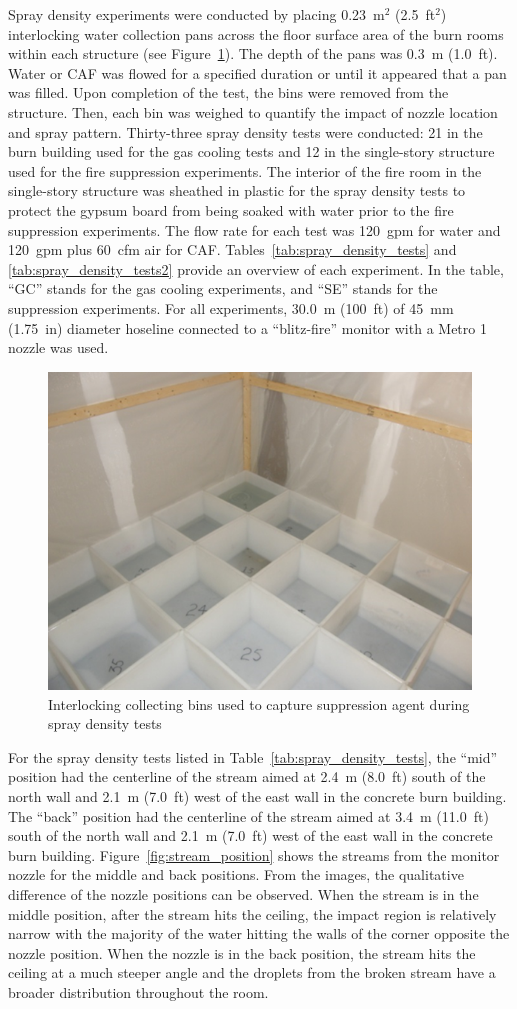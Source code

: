\documentclass[12pt,oneside]{book}
\begin{document}
Spray density experiments were conducted by placing 0.23~m$^2$ (2.5~ft$^2$) interlocking water collection pans across the floor surface area of the burn rooms within each structure (see Figure~\ref{fig:water_buckets}). The depth of the pans was 0.3~m (1.0~ft).  Water or CAF was flowed for a specified duration or until it appeared that a pan was filled.  Upon completion of the test, the bins were removed from the structure. Then, each bin was weighed to quantify the impact of nozzle location and spray pattern. Thirty-three spray density tests were conducted: 21 in the burn building used for the gas cooling tests and 12 in the single-story structure used for the fire suppression experiments. The interior of the fire room in the single-story structure was sheathed in plastic for the spray density tests to protect the gypsum board from being soaked with water prior to the fire suppression experiments. The flow rate for each test was 120~gpm for water and 120~gpm plus 60~cfm air for CAF. Tables~\ref{tab:spray_density_tests} and \ref{tab:spray_density_tests2} provide an overview of each experiment. In the table, ``GC'' stands for the gas cooling experiments, and ``SE'' stands for the suppression experiments. For all experiments, 30.0~m (100~ft) of 45~mm (1.75~in) diameter hoseline connected to a ``blitz-fire'' monitor with a Metro 1 nozzle was used.

\begin{figure}[!ht]
	\includegraphics[width=.5\columnwidth]{../Figures/Pictures/Water Tests Bins.png}
	\caption{Interlocking collecting bins used to capture suppression agent during spray density tests}
	\label{fig:water_buckets}
\end{figure}

For the spray density tests listed in Table~\ref{tab:spray_density_tests}, the ``mid'' position had the centerline of the stream aimed at 2.4~m (8.0~ft) south of the north wall and 2.1~m (7.0~ft) west of the east wall in the concrete burn building. The ``back'' position had the centerline of the stream aimed at 3.4~m (11.0~ft) south of the north wall and 2.1~m (7.0~ft) west of the east wall in the concrete burn building. Figure~\ref{fig:stream_position} shows the streams from the monitor nozzle for the middle and back positions. From the images, the qualitative difference of the nozzle positions can be observed.  When the stream is in the middle position, after the stream hits the ceiling, the impact region is relatively narrow with the majority of the water hitting the walls of the corner opposite the nozzle position.  When the nozzle is in the back position, the stream hits the ceiling at a much steeper angle and the droplets from the broken stream have a broader distribution throughout the room.
\end{document}
